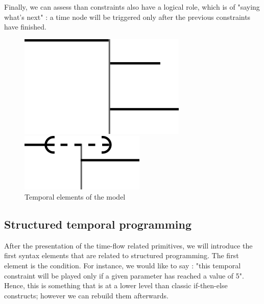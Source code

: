 \documentclass{sigchi}
\begin{document}
Finally, we can assess than constraints also have a logical role, which is of "saying what's next" : a time node will be triggered only after the previous constraints have finished.
\begin{figure}
	\centering
	\begin{minipage}[b]{.5\linewidth}
		\centering
		\includegraphics[scale=0.5]{images/timenode.png}
	\end{minipage}\begin{minipage}[b]{.5\linewidth}
		\centering
		\includegraphics[scale=0.5]{images/souple.png}
	\end{minipage}	
	
	\caption{Temporal elements of the model}
	\label{fig.cst.timenode}
\end{figure}	



\subsection{Structured temporal programming}\label{sec.structured}
After the presentation of the time-flow related primitives, we will introduce the first syntax elements that are related to structured programming.
The first element is the condition. For instance, we would like to say : "this temporal constraint will be played only if a given parameter has reached a value of 5".
Hence, this is something that is at a lower level than classic if-then-else constructs; however we can rebuild them afterwards.
\end{document}
